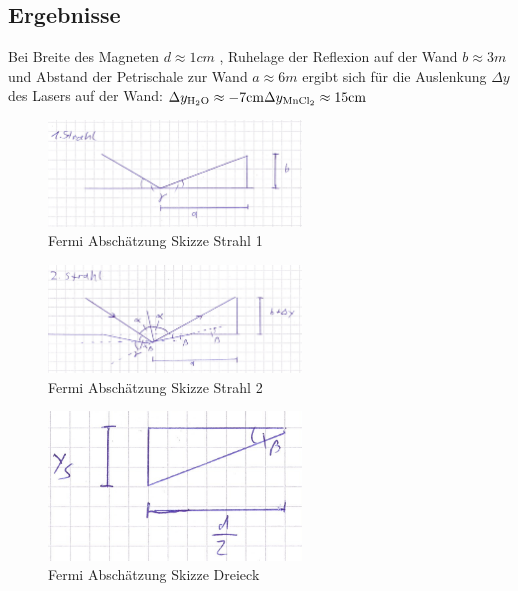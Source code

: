 \documentclass[
	a4paper,
	12pt,
	pagesize,
	ngerman
]{scrartcl}
\begin{document}
	\subsection{Ergebnisse}
	Bei Breite des Magneten $d \approx 1 \si{cm}$ , Ruhelage der Reflexion auf der Wand $b \approx 3 \si{m}$ und Abstand der Petrischale zur Wand $a \approx 6 \si{m}$ ergibt sich für die Auslenkung $\Delta y$ des Lasers auf der Wand: \newline
	$ \Delta y_\text{\ce{H2O}} \approx -7 \si{cm} \\
	\Delta y_\text{\ce{MnCl2}} \approx 15 \si{cm}$
	
	\begin{figure}[htb]
	  \centering
	    \includegraphics[width=0.6\textwidth]{Fermi1} 
	  \caption{Fermi Abschätzung Skizze Strahl 1}
	\end{figure}
		
	\begin{figure}[htb]
	  \centering
	    \includegraphics[width=0.6\textwidth]{Fermi2} 
	  \caption{Fermi Abschätzung Skizze Strahl 2}
	\end{figure}
	\begin{figure}[htb]
	  \centering
	    \includegraphics[width=0.6\textwidth]{Fermi3} 
	  \caption{Fermi Abschätzung Skizze Dreieck}
	\end{figure}
\end{document}
